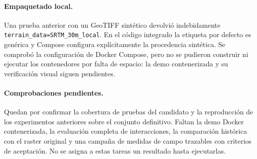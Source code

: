 \paragraph{Empaquetado local.}
Una prueba anterior con un GeoTIFF sintético devolvió indebidamente
\texttt{terrain\_data=SRTM\_30m\_local}. En el código integrado la etiqueta por
defecto es genérica y Compose configura explícitamente la procedencia sintética.
Se comprobó la configuración de Docker Compose, pero no se pudieron construir ni
ejecutar los contenedores por falta de espacio: la demo contenerizada y su
verificación visual siguen pendientes.

\paragraph{Comprobaciones pendientes.}
Quedan por confirmar la cobertura de pruebas del candidato y la reproducción de los
experimentos anteriores sobre el conjunto definitivo. Faltan la demo
Docker contenerizada, la evaluación completa de interacciones, la comparación histórica
con el raster original y una campaña de medidas de campo trazables con criterios de
aceptación. No se asigna a estas tareas un
resultado hasta ejecutarlas.
